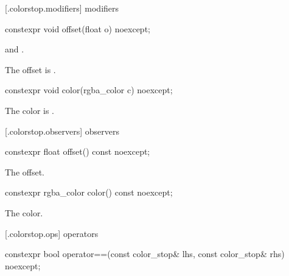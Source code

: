  [\iotwod.colorstop.modifiers] { modifiers}

%
\begin{itemdecl}
constexpr void offset(float o) noexcept;
\end{itemdecl}
\begin{itemdescr}
\pnum
\requires
{} and .

\pnum
\effects
The offset is .
\end{itemdescr}

%
\begin{itemdecl}
constexpr void color(rgba_color c) noexcept;
\end{itemdecl}
\begin{itemdescr}
\pnum
\effects
The color is .
\end{itemdescr}

 [\iotwod.colorstop.observers] { observers}

%
\begin{itemdecl}
constexpr float offset() const noexcept;
\end{itemdecl}
\begin{itemdescr}
\pnum
\returns
The offset.
\end{itemdescr}

%
\begin{itemdecl}
constexpr rgba_color color() const noexcept;
\end{itemdecl}
\begin{itemdescr}
\pnum
\returns
The color.
\end{itemdescr}

 [\iotwod.colorstop.ops] { operators}

%
\begin{itemdecl}
constexpr bool operator==(const color_stop& lhs, const color_stop& rhs)
  noexcept;
\end{itemdecl}
\begin{itemdescr}
\pnum
\returns
{}
\end{itemdescr}
